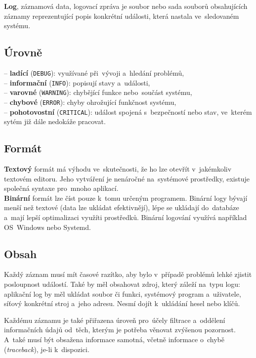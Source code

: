 \textbf{Log}, záznamová data, logovací zpráva je soubor nebo sada souborů obsahujících záznamy reprezentující popis konkrétní události, která nastala ve~sledovaném systému.

\subsection{Úrovně}

-- \textbf{ladící} (\texttt{DEBUG}): využívané při~vývoji a~hledání problémů, \\
-- \textbf{informační} (\texttt{INFO}): popisují stavy a~události, \\
-- \textbf{varovné} (\texttt{WARNING}): chybějící funkce nebo~součást systému, \\
-- \textbf{chybové} (\texttt{ERROR}): chyby ohrožující funkčnost systému, \\
-- \textbf{pohotovostní} (\texttt{CRITICAL}): událost spojená s~bezpečností nebo stav, ve~kterém sytém již dále nedokáže pracovat.

\subsection{Formát}

\textbf{Textový} formát má výhodu ve~skutečnosti, že ho lze otevřít v~jakémkoliv textovém editoru. Jeho vytváření je nenáročné na~systémové prostředky, existuje společná syntaxe pro~mnoho aplikací. \\
\textbf{Binární} formát lze číst pouze k~tomu určeným programem. Binární logy bývají menší než textové (data lze ukládat efektivnějí), lépe se ukládají do~databáze a~mají lepší optimalizaci využíti prostředků. Binární logování využívá například OS~Windows nebo Systemd.

\subsection{Obsah}

Každý záznam musí mít časové razítko, aby bylo v~případě problémů lehké zjistit posloupnost událostí. Také by měl obsahovat zdroj, který záleží na~typu logu: aplikační log by měl ukládat soubor či funkci, systémový program a~uživatele, síťový konkrétní stroj a~jeho adresu. Nesmí dojít k~ukládání hesel nebo klíčů.

Každému záznamu je také přiřazena úroveň pro~účely filtrace a~oddělení informačních údajů od~těch, kterým je potřeba věnovat zvýšenou pozornost. A~také musí být obsažena informace samotná, včetně informace o~chybě (\emph{traceback}), je-li k~dispozici.

